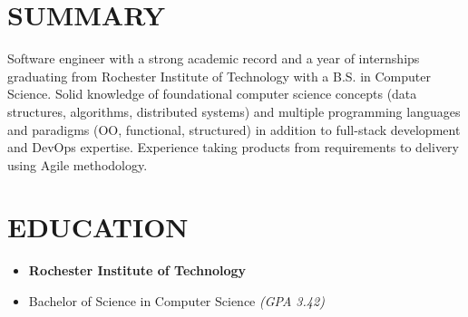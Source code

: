 \documentclass[margin]{res}
\begin{document}
  \begin{resume}

    \section{SUMMARY}
      Software engineer with a strong academic record and a year of internships graduating from Rochester Institute of Technology with a B.S. in Computer Science. Solid knowledge of foundational computer science concepts (data structures, algorithms, distributed systems) and multiple programming languages and paradigms (OO, functional, structured) in addition to full-stack development and DevOps expertise. Experience taking products from requirements to delivery using Agile methodology.




    \section{EDUCATION}
      \begin{itemize}
        \item [] \textbf{Rochester Institute of Technology}
        \item [] Bachelor of Science in Computer Science \textit{(GPA 3.42)}
      \end{itemize}



\end{resume}
\end{document}
